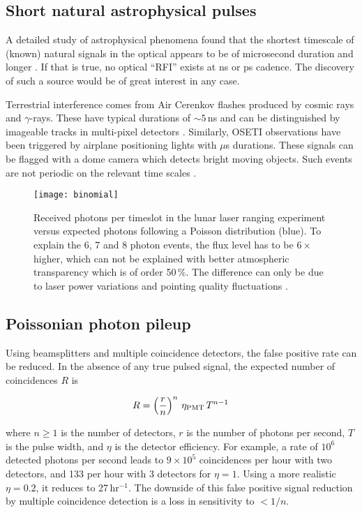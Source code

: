 \documentclass[twocolumn,tighten,longauthor]{myaastex62}
\begin{document}
\subsection{Short natural astrophysical pulses}
A detailed study of astrophysical phenomena found that the shortest timescale of (known) natural signals in the optical appears to be of microsecond duration and longer \citep{2001SPIE.4273..153H}. If that is true, no optical ``RFI'' exists at ns or ps cadence. The discovery of such a source would be of great interest in any case.


Terrestrial interference comes from Air Cerenkov flashes produced by cosmic rays and $\gamma$-rays. These have typical durations of $\sim5\,$ns and can be distinguished by imageable tracks in multi-pixel detectors \citep{2001AsBio...1..489E}. Similarly, OSETI observations have been triggered by airplane positioning lights with $\mu$s durations. These signals can be flagged with a dome camera which detects bright moving objects. Such events are not periodic on the relevant time scales \citep{2013PhDT.......161M}.


\begin{figure}
\texttt{[image: binomial]}
\caption{\label{fig:bino}Received photons per timeslot in the lunar laser ranging experiment \citep[red,][]{2008PASP..120...20M} versus expected photons following a Poisson distribution (blue). To explain the 6, 7 and 8 photon events, the flux level has to be $6\times$ higher, which can not be explained with better atmospheric transparency which is of order 50\,\%. The difference can only be due to laser power variations and pointing quality fluctuations .}
\end{figure}


\subsection{Poissonian photon pileup}
Using beamsplitters and multiple coincidence detectors, the false positive rate can be reduced. In the absence of any true pulsed signal, the expected number of coincidences $R$ is \citep{2001SPIE.4273..173W,2002PhDT........13C}

\begin{equation}
R = \left( \frac{r}{n} \right)^n \, \eta_{\rm PMT}\, T^{n-1}\,
\end{equation}

where $n \geq 1$ is the number of detectors, $r$ is the number of photons per second, $T$ is the pulse width, and $\eta$ is the detector efficiency. For example, a rate of $10^6$ detected photons per second leads to $9\times10^5$ coincidences per hour with two detectors, and 133 per hour with 3 detectors for $\eta=1$. Using a more realistic $\eta=0.2$, it reduces to 27\,hr$^{-1}$. The downside of this false positive signal reduction by multiple coincidence detection is a loss in sensitivity to $<1/n$.
\end{document}
